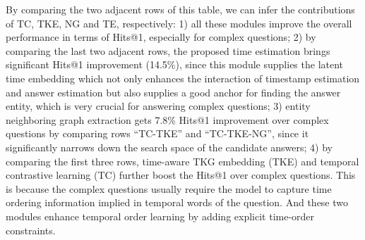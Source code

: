 \documentclass[11pt]{article}
\begin{document}
By comparing the two adjacent rows of this table, we can infer the contributions of TC, TKE, NG and TE, respectively: 1) all these modules improve the overall performance in terms of Hits@1, especially for complex questions; 2) by comparing the last two adjacent rows, the proposed time estimation brings significant Hits@1 improvement (14.5\%), since this module supplies the latent time embedding which not only enhances the interaction of timestamp estimation and answer estimation but also supplies a good anchor for finding the answer entity, which is very crucial for answering complex questions; 3) entity neighboring graph extraction gets 7.8\% Hits@1 improvement over complex questions by comparing rows ``{TC}-{TKE}'' and ``{TC}-{TKE}-{NG}'', since it significantly narrows down the search space of the candidate answers; 
4) by comparing the first three rows, time-aware TKG embedding (TKE) and temporal contrastive learning (TC) further boost the Hits@1 over complex questions. This is because the complex questions usually require the model  to capture time ordering information implied in temporal words of the question. 
And these two modules enhance temporal order learning by adding explicit time-order constraints.



\begin{table}[!ht]
    \centering
    \small
    \caption{Results of the ablation study. ``-'' means to remove a module. 
}
    \label{AblationTable4}
\end{table}
\end{document}

